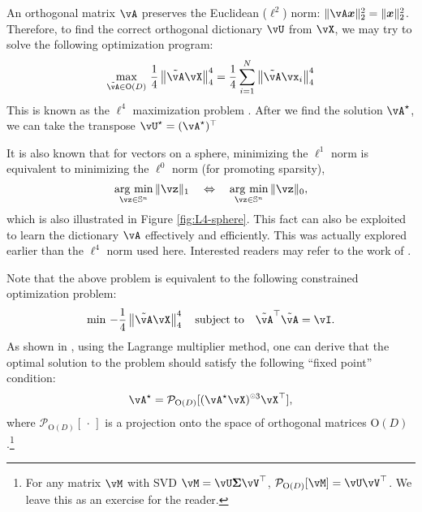 \documentclass[../../book-main.tex]{subfiles}
\begin{document}
An orthogonal matrix $\vA$ preserves the Euclidean (\(\ell^{2}\)) norm: $\|\vA \x\|_2^2 = \|\x\|_2^2$. Therefore, to find the correct orthogonal dictionary $\vU$ from $\vX$, we may try to solve the following optimization program:
\begin{equation}\label{eq0:orthogonal-dictionary-learning-l4}
    \max_{\tilde{\vA} \in \O(D)}\,
     \frac{1}{4} \norm*{
    \tilde{\vA} \vX
    }_4^4 =  \frac{1}{4} \sum_{i=1}^N \norm*{
        \tilde{\vA} \vx_i
    }_4^4
\end{equation}
This is known as the $\ell^4$ maximization problem \cite{Zhai-2020}. After we
find the solution \(\vA^{\star}\), we can take the transpose \(\vU^{\star}
= (\vA^{\star})^{\top}\)
\begin{remark}
    It is also known that for vectors on a sphere, minimizing the $\ell^1$ norm is equivalent to minimizing the $\ell^0$ norm (for promoting sparsity),
\begin{equation*}
            \argmin_{\vz \in \mathbb{S}^n}\|\vz\|_{1}\quad\Leftrightarrow\quad \argmin_{\vz \in \mathbb{S}^n}\|\vz\|_{0},
\end{equation*}
which is also illustrated in Figure \ref{fig:L4-sphere}. This fact can also be exploited to learn the dictionary $\vA$ effectively and efficiently. This was actually explored earlier than the $\ell^4$ norm used here. Interested readers may refer to the work of \cite{qu2020findingsparsestvectorssubspace}.
\end{remark}

Note that the above problem is equivalent to the following constrained optimization problem:
\begin{equation}\label{eq:orthogonal-dictionary-learning-l4}
    \min\,
    -   \frac{1}{4} \norm*{
    \tilde{\vA} \vX
    }_4^4 \quad \mbox{subject to} \quad  \tilde{\vA}^\top\tilde{\vA} = \vI.
\end{equation}
As shown in \cite{Wright-Ma-2022}, using the Lagrange multiplier method, one can derive that the optimal solution to the problem should satisfy the following 
``fixed point'' condition:
\begin{equation}
    \vA^{\star} = \mathcal{P}_{\mathrm O(D)}[( {\vA^{\star} \vX})^{\hada 3}\vX^\top],
\end{equation}
where $\mathcal{P}_{\mathrm O(D)}[\,\cdot\,]$ is a projection onto the space of
orthogonal matrices $\mathrm O(D)$.\footnote{For any matrix $\vM$ with SVD $\vM = \vU\bm \Sigma \vV^\top$, $\mathcal{P}_{\mathrm O(D)}[\vM] = \vU \vV^\top$. We leave this as an exercise for the reader.} 
\end{document}
